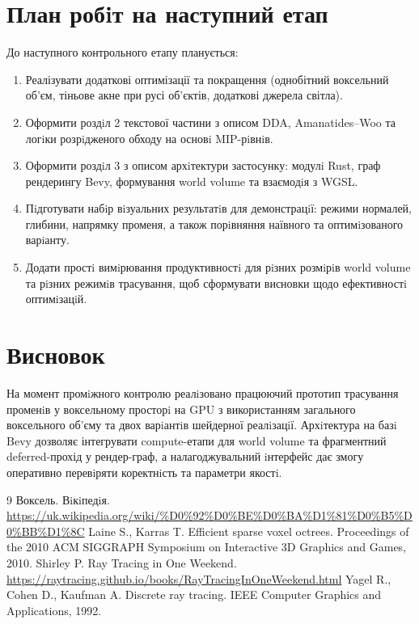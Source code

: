 \documentclass[a4paper,12pt]{article}
\begin{document}
\section*{План робiт на наступний етап}
До наступного контрольного етапу планується:
\begin{enumerate}
\item Реалізувати додаткові оптимізації та покращення (однобітний воксельний об'єм, тіньове акне при русі об'єктів, додаткові джерела світла).
\item Оформити роздiл 2 текстової частини з описом DDA, Amanatides--Woo та логiки розрiдженого обходу на основi MIP-рiвнiв.
\item Оформити роздiл 3 з описом архiтектури застосунку: модулi Rust, граф рендерингу Bevy, формування world volume та взаємодiя з WGSL.
\item Пiдготувати набiр вiзуальних результатiв для демонстрацiї: режими нормалей, глибини, напрямку променя, а також порiвняння наївного та оптимiзованого варiанту.
\item Додати простi вимiрювання продуктивностi для рiзних розмiрiв world volume та рiзних режимiв трасування, щоб сформувати висновки щодо ефективностi оптимiзацiй.
\end{enumerate}

\section*{Висновок}
На момент промiжного контролю реалiзовано працюючий прототип трасування променiв у воксельному просторi на GPU з використанням загального воксельного об’єму та двох варiантiв шейдерної реалiзацiї. Архiтектура на базi Bevy дозволяє інтегрувати compute-етапи для world volume та фрагментний deferred-прохід у рендер-граф, а налагоджувальний iнтерфейс дає змогу оперативно перевiряти коректнiсть та параметри якостi.

\begin{thebibliography}{9}
 Воксель. Вiкiпедiя. \url{https://uk.wikipedia.org/wiki/%D0%92%D0%BE%D0%BA%D1%81%D0%B5%D0%BB%D1%8C}
 Laine S., Karras T. Efficient sparse voxel octrees. Proceedings of the 2010 ACM SIGGRAPH Symposium on Interactive 3D Graphics and Games, 2010.
 Shirley P. Ray Tracing in One Weekend. \url{https://raytracing.github.io/books/RayTracingInOneWeekend.html}
 Yagel R., Cohen D., Kaufman A. Discrete ray tracing. IEEE Computer Graphics and Applications, 1992.
\end{thebibliography}
\end{document}
